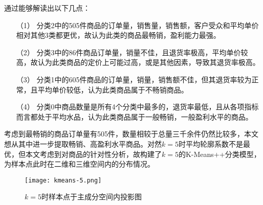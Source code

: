 \documentclass[lang=cn,11pt,a4paper,cite=authoryear]{elegantpaper}
\begin{document}
通过能够解读出以下几点：
\begin{itemize}
  \item [（1）] 
  分类2中的505件商品的订单量，销售量，销售额，客户受众和平均单价相对其他3类都更优，故认为此类的商品最畅销，盈利能力最强。  
  \item [（2）]
  分类3中的86件商品订单量，销量不佳，且退货率极高，平均单价较高，故认为此类商品的定价上可能过高，或是其他因素，导致其退货率极高。
  \item [（3）]
  分类1中的605件商品的订单量，销量，销售额不佳，但其退货率较为正常，且平均单价较低，认为此类商品属于不畅销商品。
  \item[（4）]
  分类0中商品数量是所有4个分类中最多的，退货率最低，且从各项指标而言都处于平均水品，认为此类商品属于一般畅销，一般盈利水平的商品。 
\end{itemize}

考虑到最畅销的商品订单量有505件，数量相较于总量三千余件仍然比较多，本文想从其中进一步提取畅销、高盈利水平商品。对然$k=5$时平均轮廓系数不是最优，但本文考虑到对商品的针对性分析，故构建了$k=5$的K-Means++分类模型，为样本点此时在二维和三维空间内的分布情况。
\begin{figure}[H]
  \centering
  \texttt{[image: kmeans-5.png]}
  \caption{$k=5$时样本点于主成分空间内投影图}
  \label{5聚类二维三维图}
\end{figure}
\end{document}

